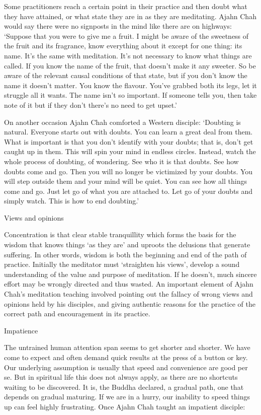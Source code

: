 Some practitioners reach a certain point in their practice and then
doubt what they have attained, or what state they are in as they are
meditating. Ajahn Chah would say there were no signposts in the mind
like there are on highways: `Suppose that you were to give me a fruit. I
might be aware of the sweetness of the fruit and its fragrance, know
everything about it except for one thing: its name. It's the same with
meditation. It's not necessary to know what things are called. If you
know the name of the fruit, that doesn't make it any sweeter. So be
aware of the relevant causal conditions of that state, but if you don't
know the name it doesn't matter. You know the flavour. You've grabbed
both its legs, let it struggle all it wants. The name isn't so
important. If someone tells you, then take note of it but if they don't
there's no need to get upset.'

On another occasion Ajahn Chah comforted a Western disciple: `Doubting
is natural. Everyone starts out with doubts. You can learn a great deal
from them. What is important is that you don't identify with your
doubts; that is, don't get caught up in them. This will spin your mind
in endless circles. Instead, watch the whole process of doubting, of
wondering. See who it is that doubts. See how doubts come and go. Then
you will no longer be victimized by your doubts. You will step outside
them and your mind will be quiet. You can see how all things come and
go. Just let go of what you are attached to. Let go of your doubts and
simply watch. This is how to end doubting.'

Views and opinions

Concentration is that clear stable tranquillity which forms the basis
for the wisdom that knows things `as they are' and uproots the delusions
that generate suffering. In other words, wisdom is both the beginning
and end of the path of practice. Initially the meditator must
`straighten his views', develop a sound understanding of the value and
purpose of meditation. If he doesn't, much sincere effort may be wrongly
directed and thus wasted. An important element of Ajahn Chah's
meditation teaching involved pointing out the fallacy of wrong views and
opinions held by his disciples, and giving authentic reasons for the
practice of the correct path and encouragement in its practice.

Impatience

The untrained human attention span seems to get shorter and shorter. We
have come to expect and often demand quick results at the press of a
button or key. Our underlying assumption is usually that speed and
convenience are good per se. But in spiritual life this does not always
apply, as there are no shortcuts waiting to be discovered. It is, the
Buddha declared, a gradual path, one that depends on gradual maturing.
If we are in a hurry, our inability to speed things up can feel highly
frustrating. Once Ajahn Chah taught an impatient disciple:

